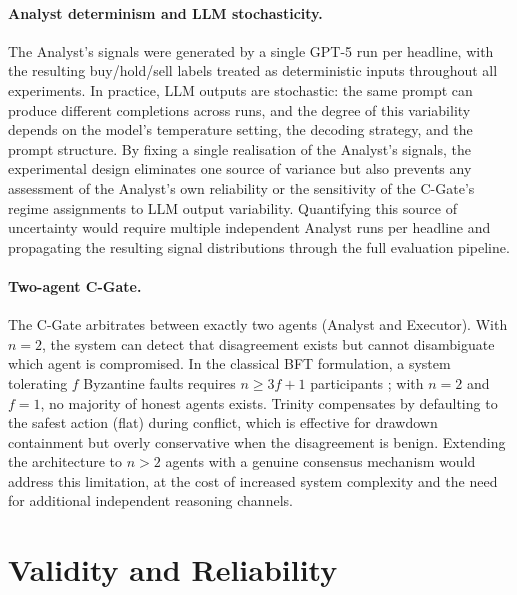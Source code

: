\paragraph{Analyst determinism and LLM stochasticity.}
The Analyst's signals were generated by a single GPT-5 run per headline,
with the resulting buy/hold/sell labels treated as deterministic inputs
throughout all experiments. In practice, LLM outputs are stochastic: the same
prompt can produce different completions across runs, and the degree of this
variability depends on the model's temperature setting, the decoding strategy,
and the prompt structure. By fixing a single realisation of the Analyst's
signals, the experimental design eliminates one source of variance but also
prevents any assessment of the Analyst's own reliability or the sensitivity
of the C-Gate's regime assignments to LLM output variability. Quantifying
this source of uncertainty would require multiple independent Analyst runs
per headline and propagating the resulting signal distributions through the
full evaluation pipeline.

\paragraph{Two-agent C-Gate.}
The C-Gate arbitrates between exactly two agents (Analyst and Executor). With
$n = 2$, the system can detect that disagreement exists but cannot
disambiguate which agent is compromised. In the classical BFT formulation, a
system tolerating $f$ Byzantine faults requires $n \geq 3f + 1$ participants
\cite{lamport1982byzantine}; with $n = 2$ and $f = 1$, no majority of honest
agents exists. Trinity compensates by defaulting to the safest action (flat)
during conflict, which is effective for drawdown containment but overly
conservative when the disagreement is benign. Extending the architecture to
$n > 2$ agents with a genuine consensus mechanism would address this
limitation, at the cost of increased system complexity and the need for
additional independent reasoning channels.

\section{Validity and Reliability}
\label{sec:disc-validity}

